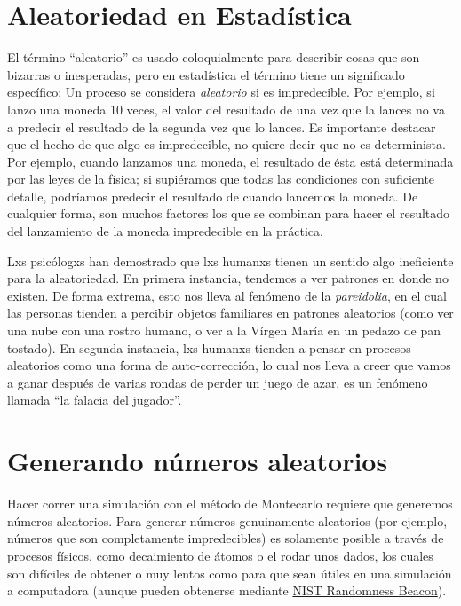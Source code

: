 \documentclass[
  12pt,
]{book}
\begin{document}
\hypertarget{aleatoriedad-en-estaduxedstica}{%
\section{Aleatoriedad en Estadística}\label{aleatoriedad-en-estaduxedstica}}

El término ``aleatorio'' es usado coloquialmente para describir cosas que son bizarras o inesperadas, pero en estadística el término tiene un significado específico: Un proceso se considera \emph{aleatorio} si es impredecible. Por ejemplo, si lanzo una moneda 10 veces, el valor del resultado de una vez que la lances no va a predecir el resultado de la segunda vez que lo lances. Es importante destacar que el hecho de que algo es impredecible, no quiere decir que no es determinista. Por ejemplo, cuando lanzamos una moneda, el resultado de ésta está determinada por las leyes de la física; si supiéramos que todas las condiciones con suficiente detalle, podríamos predecir el resultado de cuando lancemos la moneda. De cualquier forma, son muchos factores los que se combinan para hacer el resultado del lanzamiento de la moneda impredecible en la práctica.

Lxs psicólogxs han demostrado que lxs humanxs tienen un sentido algo ineficiente para la aleatoriedad. En primera instancia, tendemos a ver patrones en donde no existen. De forma extrema, esto nos lleva al fenómeno de la \emph{pareidolia}, en el cual las personas tienden a percibir objetos familiares en patrones aleatorios (como ver una nube con una rostro humano, o ver a la Vírgen María en un pedazo de pan tostado). En segunda instancia, lxs humanxs tienden a pensar en procesos aleatorios como una forma de auto-corrección, lo cual nos lleva a creer que vamos a ganar después de varias rondas de perder un juego de azar, es un fenómeno llamada ``la falacia del jugador''.

\hypertarget{generando-nuxfameros-aleatorios}{%
\section{Generando números aleatorios}\label{generando-nuxfameros-aleatorios}}

Hacer correr una simulación con el método de Montecarlo requiere que generemos números aleatorios. Para generar números genuinamente aleatorios (por ejemplo, números que son completamente impredecibles) es solamente posible a través de procesos físicos, como decaimiento de átomos o el rodar unos dados, los cuales son difíciles de obtener o muy lentos como para que sean útiles en una simulación a computadora (aunque pueden obtenerse mediante \href{https://www.nist.gov/programs-projects/nist-randomness-beacon\%5D}{NIST Randomness Beacon}).
\end{document}
